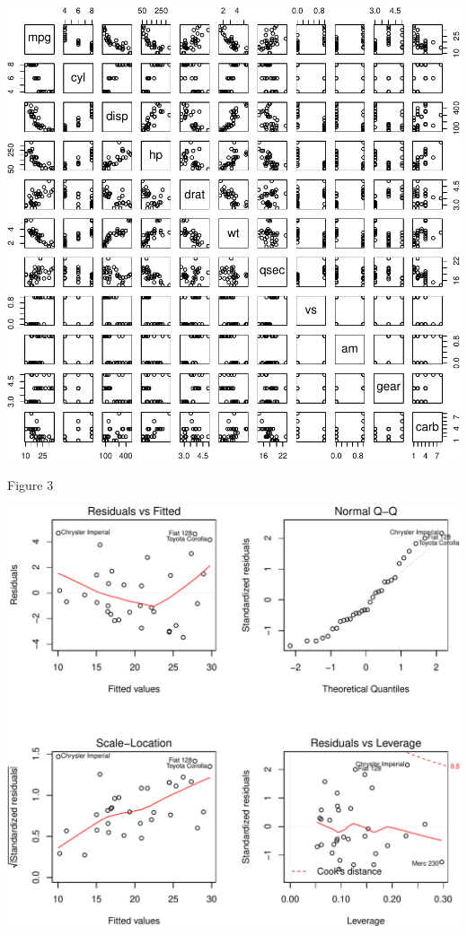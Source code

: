 \documentclass[]{article}
\begin{document}
\includegraphics{assigment_files/figure-latex/unnamed-chunk-12-1.pdf}

Figure 3

\includegraphics{assigment_files/figure-latex/unnamed-chunk-13-1.pdf}
\end{document}
